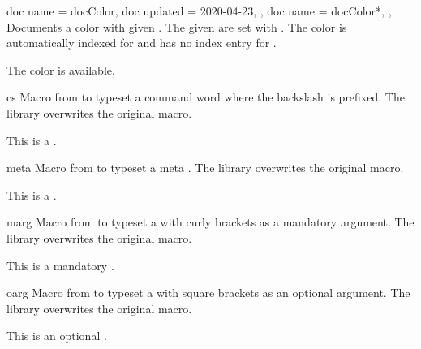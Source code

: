 \begin{docCommands}[doc parameter oarg marg={options}{name}]
  {
    {
      doc name    = docColor,
      doc updated = 2020-04-23,
    },
    {
      doc name = docColor*,
    },
  }
  Documents a color with given .
  The given  are set with .
  The color is automatically indexed for 
  and has no index entry for .
\begin{dispExample}
The color  is available.
\end{dispExample}
\end{docCommands}



\begin{docCommand}{cs}{}
  Macro from  \cite{carlisle:ltxdoc} to typeset a command word 
  where the backslash is prefixed. The library overwrites the original macro.
\begin{dispExample}
This is a .
\end{dispExample}
\end{docCommand}

\begin{docCommand}{meta}{}
  Macro from  \cite{mittelbach:doc} to typeset a meta .
  The library overwrites the original macro.
\begin{dispExample}
This is a .
\end{dispExample}
\end{docCommand}


\begin{docCommand}{marg}{}
  Macro from  \cite{carlisle:ltxdoc} to typeset a  with
  curly brackets as a mandatory argument. The library overwrites the original macro.
\begin{dispExample}
This is a mandatory .
\end{dispExample}
\end{docCommand}

\begin{docCommand}{oarg}{}
  Macro from  \cite{carlisle:ltxdoc} to typeset a  with
  square brackets as an optional argument. The library overwrites the original macro.
\begin{dispExample}
This is an optional .
\end{dispExample}
\end{docCommand}

